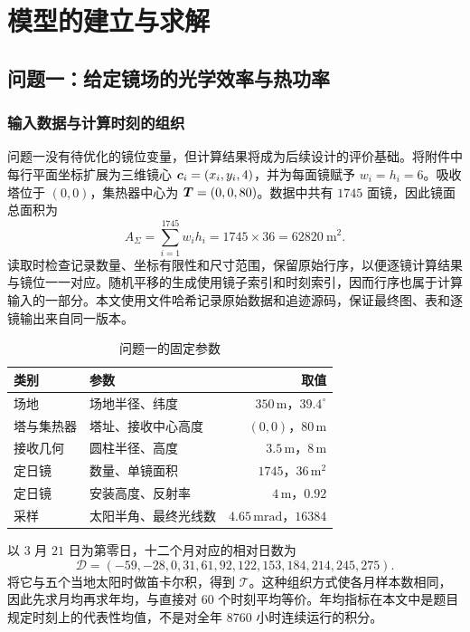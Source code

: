 \section{模型的建立与求解}
\subsection{问题一：给定镜场的光学效率与热功率}
\subsubsection{输入数据与计算时刻的组织}
问题一没有待优化的镜位变量，但计算结果将成为后续设计的评价基础。将附件中每行平面坐标扩展为三维镜心 $\bm{c}_i=(x_i,y_i,4)$，并为每面镜赋予 $w_i=h_i=6$。吸收塔位于 $(0,0)$，集热器中心为 $\bm{T}=(0,0,80)$。数据中共有 $1745$ 面镜，因此镜面总面积为
\begin{equation}
A_\Sigma=\sum_{i=1}^{1745}w_ih_i=1745\times36=62820\ \mathrm m^2.
\end{equation}
读取时检查记录数量、坐标有限性和尺寸范围，保留原始行序，以便逐镜计算结果与镜位一一对应。随机平移的生成使用镜子索引和时刻索引，因而行序也属于计算输入的一部分。本文使用文件哈希记录原始数据和追迹源码，保证最终图、表和逐镜输出来自同一版本。

\begin{table}[H]\centering\small
\caption{问题一的固定参数}
\begin{tabular}{llr}\toprule
类别 & 参数 & 取值\\\midrule
场地 & 场地半径、纬度 & $350\,\mathrm m$，$39.4^\circ$\\
塔与集热器 & 塔址、接收中心高度 & $(0,0)$，$80\,\mathrm m$\\
接收几何 & 圆柱半径、高度 & $3.5\,\mathrm m$，$8\,\mathrm m$\\
定日镜 & 数量、单镜面积 & $1745$，$36\,\mathrm m^2$\\
定日镜 & 安装高度、反射率 & $4\,\mathrm m$，$0.92$\\
采样 & 太阳半角、最终光线数 & $4.65\,\mathrm{mrad}$，$16384$\\
\bottomrule\end{tabular}\end{table}

以 $3$ 月 $21$ 日为第零日，十二个月对应的相对日数为
\begin{equation}
\mathcal D=(-59,-28,0,31,61,92,122,153,184,214,245,275).
\end{equation}
将它与五个当地太阳时做笛卡尔积，得到 $\mathcal T$。这种组织方式使各月样本数相同，因此先求月均再求年均，与直接对 $60$ 个时刻平均等价。年均指标在本文中是题目规定时刻上的代表性均值，不是对全年 $8760$ 小时连续运行的积分。

